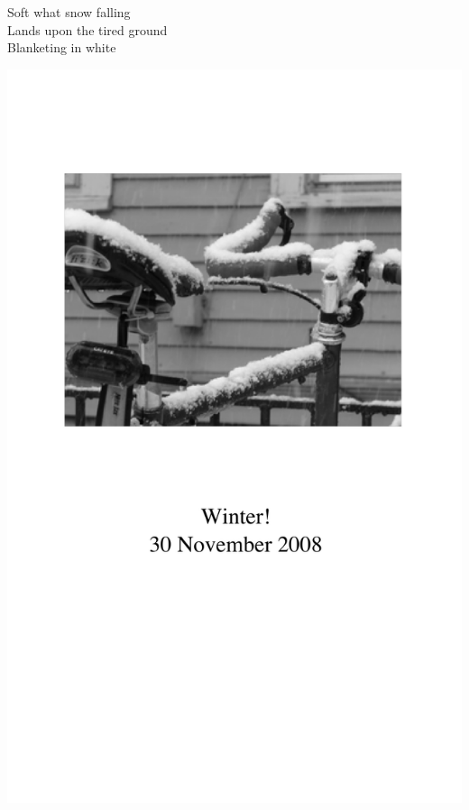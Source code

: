 \documentclass[12pt]{article}
\begin{document}
Soft what snow falling \\
Lands upon the tired ground \\
Blanketing in white


\newpage

\includegraphics{back.png}

\newpage
\end{document}
